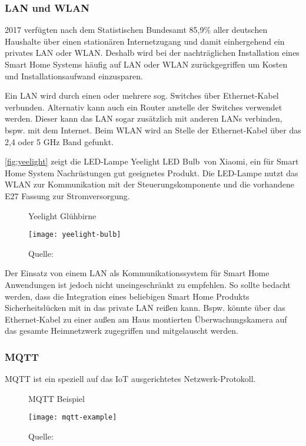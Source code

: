 \subsubsection{LAN und WLAN}

2017 verfügten nach dem Statistischen Bundesamt 85,9\% aller deutschen Haushalte über einen stationären Internetzugang und damit einhergehend ein privates \ac{LAN} oder \ac{WLAN}.
Deshalb wird bei der nachträglichen Installation eines Smart Home Systems häufig auf \ac{LAN} oder \ac{WLAN} zurückgegriffen um Kosten und Installationsaufwand einzusparen.

Ein \ac{LAN} wird durch einen oder mehrere sog. Switches über Ethernet-Kabel verbunden.
Alternativ kann auch ein Router anstelle der Switches verwendet werden.
Dieser kann das \ac{LAN} sogar zusätzlich mit anderen \acp{LAN} verbinden, bspw. mit dem Internet.
Beim \ac{WLAN} wird an Stelle der Ethernet-Kabel über das 2,4 oder 5 GHz Band gefunkt.

\autoref{fig:yeelight} zeigt die LED-Lampe \glqq Yeelight LED Bulb\grqq \ von Xiaomi, ein für Smart Home System Nachrüstungen gut geeignetes Produkt.
Die LED-Lampe nutzt das \ac{WLAN} zur Kommunikation mit der Steuerungskomponente und die vorhandene E27 Fassung zur Stromversorgung.

\begin{wrapfigure}{r}{0.4\textwidth}
	\centering
	\caption{Yeelight Glühbirne}
	\texttt{[image: yeelight-bulb]}
	\caption*{\footnotesize{Quelle: }}
	\label{fig:yeelight}
\end{wrapfigure}

Der Einsatz von einem \ac{LAN} als Kommunikationssystem für Smart Home Anwendungen ist jedoch nicht uneingeschränkt zu empfehlen.
So sollte bedacht werden, dass die Integration eines beliebigen Smart Home Produkts Sicherheitslücken mit in das private \ac{LAN} reißen kann.
Bspw. könnte über das Ethernet-Kabel zu einer außen am Haus montierten Überwachungskamera auf das gesamte Heimnetzwerk zugegriffen und mitgelauscht werden.

\subsubsection{MQTT}

\ac{MQTT} ist ein speziell auf das \ac{IoT} ausgerichtetes Netzwerk-Protokoll.

\begin{figure}[ht]
	\centering
	\caption{MQTT Beispiel}
	\texttt{[image: mqtt-example]}
	\caption*{\footnotesize{Quelle: }}
	\label{fig:mqtt_example}
\end{figure}

